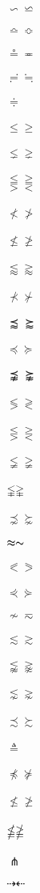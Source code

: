 \documentclass{article}
\begin{document}
$\backsim \backsimeq$\\\\
$\bumpeq \Bumpeq $\\\\
$\circeq \eqcirc $\\\\
$\risingdotseq \fallingdotseq $\\\\
$\doteqdot $\\\\
$\leqslant \geqslant $\\\\
$\lneq \gneq $\\\\
$\lesseqqgtr \gtreqqless $\\\\
$\nless \ngtr $\\\\
$\nleq \ngeq $\\\\
$\lessapprox \gtrapprox $\\\\
$\nprec \nsucc $\\\\
$\precapprox \succapprox $\\\\
$\preccurlyeq \succcurlyeq $\\\\
$\precnapprox \succnapprox $\\\\
$\lessgtr \gtrless $\\\\
$\lesseqgtr \gtreqless $\\\\
$\lneqq \gneqq $\\\\
$\lvertneqq \gvertneqq $\\\\
$\precnsim \succnsim $\\\\
$\thickapprox \thicksim$\\\\
$\eqslantless \eqslantgtr $\\\\
$\curlyeqprec \curlyeqsucc $\\\\
$\nsim \eqsim $\\\\
$\lesssim \gtrsim $\\\\
$\lnapprox \gnapprox $\\\\
$\lnsim \gnsim $\\\\
$\precsim \succsim $\\\\
$\triangleq $\\\\
$\npreceq \nsucceq $\\\\
$\nleqslant \ngeqslant $\\\\
$\nleqq \ngeqq $\\\\
$\pitchfork$\\\\
$\dashrightarrow \dashleftarrow$\\\\
\end{document}
